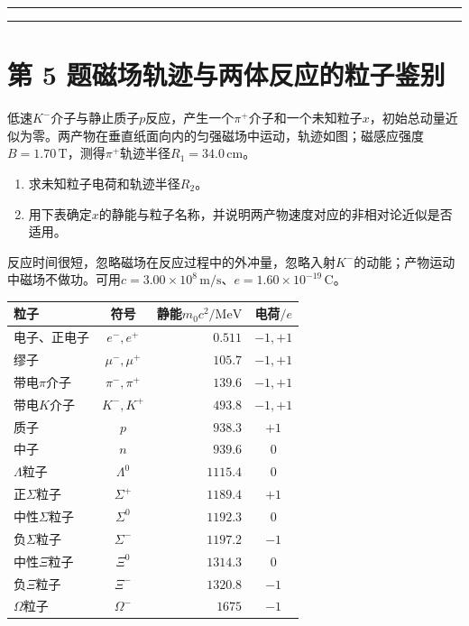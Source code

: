 \documentclass[UTF8,fontset=fandol,a4paper,11pt]{ctexart}
\begin{document}
\par\vspace{5mm}\par\vspace{3mm}\noindent\textcolor{rulegray}{\rule{\linewidth}{0.3pt}}\par\vspace{12mm}\noindent\textcolor{rulegray}{\rule{\linewidth}{0.3pt}}

\clearpage


\section*{第 5 题\quad 磁场轨迹与两体反应的粒子鉴别}\label{q:5}


低速$K^-$介子与静止质子$p$反应，产生一个$\pi^+$介子和一个未知粒子$x$，初始总动量近似为零。两产物在垂直纸面向内的匀强磁场中运动，轨迹如图；磁感应强度$B=1.70\,\mathrm T$，测得$\pi^+$轨迹半径$R_1=34.0\,\mathrm{cm}$。
\begin{enumerate}
\item 求未知粒子电荷和轨迹半径$R_2$。
\item 用下表确定$x$的静能与粒子名称，并说明两产物速度对应的非相对论近似是否适用。
\end{enumerate}
反应时间很短，忽略磁场在反应过程中的外冲量，忽略入射$K^-$的动能；产物运动中磁场不做功。可用$c=3.00\times10^8\,\mathrm{m/s}$、$e=1.60\times10^{-19}\,\mathrm C$。

\begin{longtable}{@{}l c r c@{}}
\toprule 粒子 & 符号 & 静能$m_0c^2/\mathrm{MeV}$ & 电荷$/e$\\\midrule
电子、正电子 & $e^-,e^+$ & $0.511$ & $-1,+1$\\
缪子 & $\mu^-,\mu^+$ & $105.7$ & $-1,+1$\\
带电$\pi$介子 & $\pi^-,\pi^+$ & $139.6$ & $-1,+1$\\
带电$K$介子 & $K^-,K^+$ & $493.8$ & $-1,+1$\\
质子 & $p$ & $938.3$ & $+1$\\
中子 & $n$ & $939.6$ & $0$\\
$\Lambda$粒子 & $\Lambda^0$ & $1115.4$ & $0$\\
正$\Sigma$粒子 & $\Sigma^+$ & $1189.4$ & $+1$\\
中性$\Sigma$粒子 & $\Sigma^0$ & $1192.3$ & $0$\\
负$\Sigma$粒子 & $\Sigma^-$ & $1197.2$ & $-1$\\
中性$\Xi$粒子 & $\Xi^0$ & $1314.3$ & $0$\\
负$\Xi$粒子 & $\Xi^-$ & $1320.8$ & $-1$\\
$\Omega$粒子 & $\Omega^-$ & $1675$ & $-1$\\
\bottomrule
\end{longtable}
\end{document}
